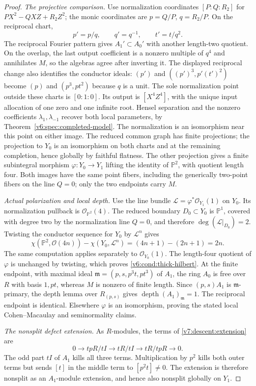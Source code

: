 \documentclass[10pt,fleqn]{article}
\numberwithin{equation}{section}
\newcommand{\PP}{\mathbb P}
\begin{document}
\begin{proof}
\emph{The projective comparison.}
Use normalization coordinates
$[P:Q:R_2]$ for $PX^2-QXZ+R_2Z^2$; the monic coordinates are
$p=Q/P$, $q=R_2/P$.  On the reciprocal chart,
\[
 p'=p/q,\qquad q'=q^{-1},\qquad t'=t/q^2.
\]
The reciprocal Fourier pattern gives $A_1'\subset A_0'$ with another
length-two quotient.  On the overlap, the last output coefficient is a
nonzero multiple of $q^4$ and annihilates $M$, so the algebras agree
after inverting it.  The displayed reciprocal change also identifies
the conductor ideals: $(p')$ and $((p')^3,p'(t')^2)$ become $(p)$ and
$(p^3,pt^2)$ because $q$ is a unit.  The sole normalization point
outside these charts is $[0:1:0]$.
Its output is $[X^4Z^4]$, with the unique input allocation of one zero
and one infinite root.  Hensel separation and the nonzero coefficients
$\lambda_1,\lambda_{-1}$ recover both local parameters, by
Theorem~\ref{v6:spec:completed-model}.  The normalization is an
isomorphism near this point on either image.
The reduced common graph has finite projections; the projection to
$Y_0$ is an isomorphism on both charts and at the remaining completion,
hence globally by faithful flatness.  The other projection gives a
finite subintegral morphism $\varphi:Y_0\to Y_1$ lifting the identity
of $\PP^2$, with quotient length four.
Both images have the same point fibers, including the generically
two-point fibers on the line $Q=0$; only the two endpoints carry $M$.

\emph{Actual polarization and local depth.}
Use the line bundle $\mathcal L=\varphi^*\mathcal O_{Y_1}(1)$ on $Y_0$.
Its normalization pullback is $\mathcal O_{\PP^2}(4)$.
The reduced boundary $D_0\subset Y_0$ is $\PP^1$, covered with degree
two by the normalization line $Q=0$, and therefore
$\deg(\mathcal L|_{D_0})=2$.
Twisting the conductor sequence for $Y_0$ by $\mathcal L^n$ gives
\[
 \chi(\PP^2,\mathcal O(4n))-\chi(Y_0,\mathcal L^n)
 =(4n+1)-(2n+1)=2n.
\]
The same computation applies separately to $\mathcal O_{Y_0}(1)$.
The length-four quotient of $\varphi$ is unchanged by twisting,
which proves \eqref{v6:cond:thick-hilbert}.
At the finite endpoint, with maximal ideal
$\mathfrak m=(p,s,p^3t,pt^3)$ of $A_1$, the ring $A_0$
is free over $R$ with basis $1,pt$, whereas $M$ is nonzero
of finite length.  Since $(p,s)A_1$ is $\mathfrak m$-primary,
the depth lemma over $R_{(p,s)}$ gives
$\operatorname{depth}(A_1)_{\mathfrak m}=1$.
The reciprocal endpoint is identical.  Elsewhere $\varphi$ is an
isomorphism, proving the stated local Cohen--Macaulay and seminormality
claims.

\emph{The nonsplit defect extension.}
As $R$-modules, the terms of \eqref{v7:descent:extension} are
\[
 0\longrightarrow tpR/tI\longrightarrow tR/tI
   \longrightarrow tR/tpR\longrightarrow0.
\]
The odd part $tI$ of $A_1$ kills all three terms.
Multiplication by $p^2$ kills both outer terms but sends $[t]$ in the
middle term to $[p^2t]\ne0$.  The extension is therefore nonsplit as
an $A_1$-module extension, and hence also nonsplit globally on $Y_1$.
\end{proof}
\end{document}
